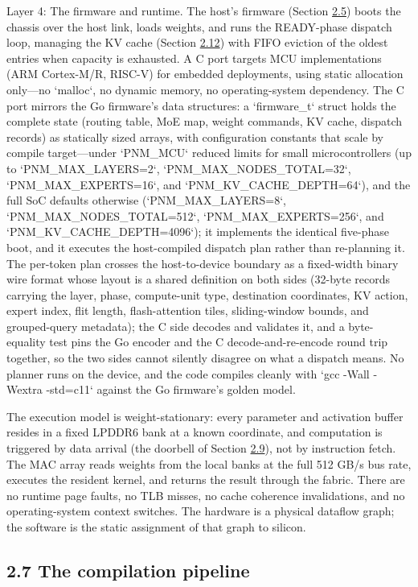 \documentclass[10pt,twocolumn]{article}
\begin{document}
Layer 4: The firmware and runtime. The host's firmware (Section \hyperref[sec:2.5]{2.5}) boots the chassis over the host link, loads weights, and runs the READY-phase dispatch loop, managing the KV cache (Section \hyperref[sec:2.12]{2.12}) with FIFO eviction of the oldest entries when capacity is exhausted. A C port targets MCU implementations (ARM Cortex-M/R, RISC-V) for embedded deployments, using static allocation only---no `malloc`, no dynamic memory, no operating-system dependency. The C port mirrors the Go firmware's data structures: a `firmware\_t` struct holds the complete state (routing table, MoE map, weight commands, KV cache, dispatch records) as statically sized arrays, with configuration constants that scale by compile target---under `PNM\_MCU` reduced limits for small microcontrollers (up to `PNM\_MAX\_LAYERS=2`, `PNM\_MAX\_NODES\_TOTAL=32`, `PNM\_MAX\_EXPERTS=16`, and `PNM\_KV\_CACHE\_DEPTH=64`), and the full SoC defaults otherwise (`PNM\_MAX\_LAYERS=8`, `PNM\_MAX\_NODES\_TOTAL=512`, `PNM\_MAX\_EXPERTS=256`, and `PNM\_KV\_CACHE\_DEPTH=4096`); it implements the identical five-phase boot, and it executes the host-compiled dispatch plan rather than re-planning it. The per-token plan crosses the host-to-device boundary as a fixed-width binary wire format whose layout is a shared definition on both sides (32-byte records carrying the layer, phase, compute-unit type, destination coordinates, KV action, expert index, flit length, flash-attention tiles, sliding-window bounds, and grouped-query metadata); the C side decodes and validates it, and a byte-equality test pins the Go encoder and the C decode-and-re-encode round trip together, so the two sides cannot silently disagree on what a dispatch means. No planner runs on the device, and the code compiles cleanly with `gcc -Wall -Wextra -std=c11` against the Go firmware's golden model.

The execution model is weight-stationary: every parameter and activation buffer resides in a fixed LPDDR6 bank at a known coordinate, and computation is triggered by data arrival (the doorbell of Section \hyperref[sec:2.9]{2.9}), not by instruction fetch. The MAC array reads weights from the local banks at the full 512 GB/s bus rate, executes the resident kernel, and returns the result through the fabric. There are no runtime page faults, no TLB misses, no cache coherence invalidations, and no operating-system context switches. The hardware is a physical dataflow graph; the software is the static assignment of that graph to silicon.

\subsection*{2.7 The compilation pipeline}\label{sec:2.7}
\end{document}
